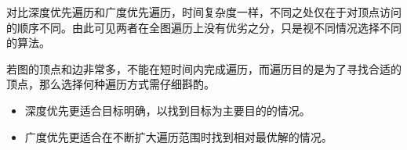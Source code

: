\begin{frame}\ft{\subsubsecname}
    
\end{frame}


\begin{frame}\ft{\subsubsecname}
    
\end{frame}


\begin{frame}\ft{\subsubsecname}
    
\end{frame}


\begin{frame}
  对比深度优先遍历和广度优先遍历，时间复杂度一样，不同之处仅在于对顶点访问的顺序不同。由此可见两者在全图遍历上没有优劣之分，只是视不同情况选择不同的算法。
\end{frame}


\begin{frame}
  若图的顶点和边非常多，不能在短时间内完成遍历，而遍历目的是为了寻找合适的顶点，那么选择何种遍历方式需仔细斟酌。\vspace{0.1in}

  \begin{itemize}
  \item 深度优先更适合目标明确，以找到目标为主要目的的情况。\\[0.1in]
  \item 广度优先更适合在不断扩大遍历范围时找到相对最优解的情况。
  \end{itemize}
\end{frame}
